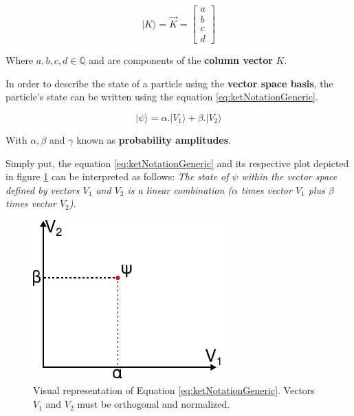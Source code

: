 			\begin{equation}
				|K\rangle = \vec{K} = \begin{bmatrix}
					a \\
					b \\
					c \\
					d
				\end{bmatrix}
				\label{eq:ketNotationVector}
			\end{equation}
			
			\par Where $a, b, c, d \in \mathbb{Q}$ and are components of the \textbf{column vector} $K$.\newline

			\par In order to describe the state of a particle using the \textbf{vector space basis}, the particle's state can be written using the equation \ref{eq:ketNotationGeneric}.
			
			\begin{equation}
				| \psi \rangle = \alpha . | V_1 \rangle + \beta . | V_2 \rangle
				\label{eq:ketNotationGeneric}
			\end{equation}
		
			\par With $\alpha, \beta$ and $\gamma$ known as \textbf{probability amplitudes}.\newline
						
			\par Simply put, the equation \ref{eq:ketNotationGeneric} and its respective plot depicted in figure \ref{fig:diracPlot} can be interpreted as follows: \textit{The state of $\psi$ within the vector space defined by vectors $V_1$ and $V_2$ is a linear combination ($\alpha$ times vector $V_1$ plus $\beta$ times vector $V_2$)}.
			
			\begin{figure}[h]
				\centering
				\includegraphics{images/diracPlot}
				\caption{Visual representation of Equation \ref{eq:ketNotationGeneric}. Vectors $V_1$ and $V_2$ must be orthogonal and normalized.}
				\label{fig:diracPlot}
			\end{figure}
	
